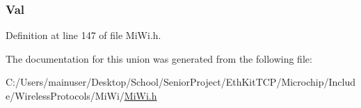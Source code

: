 \subsubsection[{Val}]{ Val}\label{union___m_i_w_i___s_t_a_t_e___m_a_c_h_i_n_e_aa498550e7f87da9a38dc71609652e6bd}


Definition at line 147 of file Mi\+Wi.\+h.



The documentation for this union was generated from the following file\+:\begin{DoxyCompactItemize}
\item 
C\+:/\+Users/mainuser/\+Desktop/\+School/\+Senior\+Project/\+Eth\+Kit\+T\+C\+P/\+Microchip/\+Include/\+Wireless\+Protocols/\+Mi\+Wi/\hyperlink{_mi_wi_8h}{Mi\+Wi.\+h}\end{DoxyCompactItemize}
